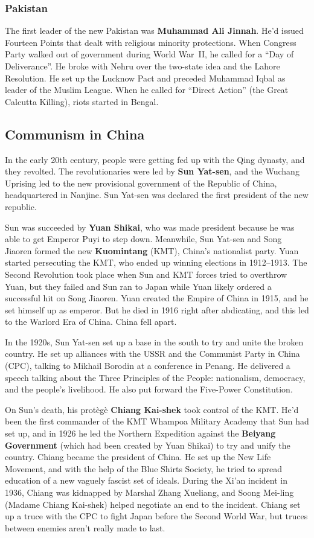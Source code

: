 \subsubsection*{Pakistan}

The first leader of the new Pakistan was \textbf{Muhammad Ali Jinnah}.
He'd issued Fourteen Points that dealt with religious minority protections.
When Congress Party walked out of government during World War~II, he called for a ``Day of Deliverance''.
He broke with Nehru over the two-state idea and the Lahore Resolution.
He set up the Lucknow Pact and preceded Muhammad Iqbal as leader of the Muslim League.
When he called for ``Direct Action'' (the Great Calcutta Killing), riots started in Bengal.

\subsection*{Communism in China}

In the early 20th century, people were getting fed up with the Qing dynasty, and they revolted.
The revolutionaries were led by \textbf{Sun Yat-sen},
and the Wuchang Uprising led to the new provisional government of the Republic of China, headquartered in Nanjine.
Sun Yat-sen was declared the first president of the new republic.

Sun was succeeded by \textbf{Yuan Shikai},
who was made president because he was able to get Emperor Puyi to step down.
Meanwhile, Sun Yat-sen and Song Jiaoren formed the new \textbf{Kuomintang} (KMT), China's nationalist party.
Yuan started persecuting the KMT, who ended up winning elections in 1912--1913.
The Second Revolution took place when Sun and KMT forces tried to overthrow Yuan,
but they failed and Sun ran to Japan while Yuan likely ordered a successful hit on Song Jiaoren.
Yuan created the Empire of China in 1915, and he set himself up as emperor.
But he died in 1916 right after abdicating, and this led to the Warlord Era of China.
China fell apart.

In the 1920s, Sun Yat-sen set up a base in the south to try and unite the broken country.
He set up alliances with the USSR and the Communist Party in China (CPC),
talking to Mikhail Borodin at a conference in Penang.
He delivered a speech talking about the Three Principles of the People:
nationalism, democracy, and the people's livelihood.
He also put forward the Five-Power Constitution.

On Sun's death, his prot\`eg\`e \textbf{Chiang Kai-shek} took control of the KMT\@.
He'd been the first commander of the KMT Whampoa Military Academy that Sun had set up,
and in 1926 he led the Northern Expedition against the \textbf{Beiyang Government}
(which had been created by Yuan Shikai)
to try and unify the country.
Chiang became the president of China.
He set up the New Life Movement, and with the help of the Blue Shirts Society,
he tried to spread education of a new vaguely fascist set of ideals.
During the Xi'an incident in 1936, Chiang was kidnapped by Marshal Zhang Xueliang,
and Soong Mei-ling (Madame Chiang Kai-shek) helped negotiate an end to the incident.
Chiang set up a truce with the CPC to fight Japan before the Second World War,
but truces between enemies aren't really made to last.

